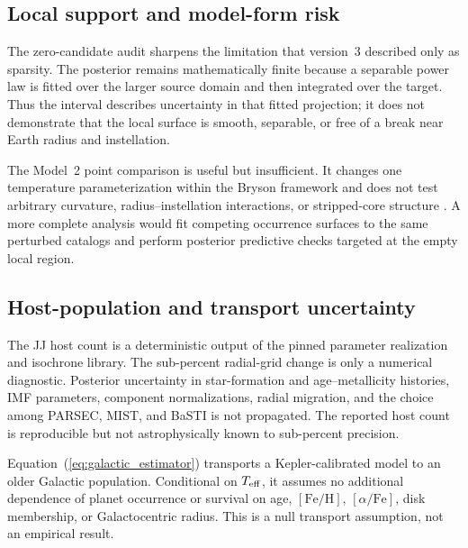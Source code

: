 \subsection{Local support and model-form risk}

The zero-candidate audit sharpens the limitation that version~3 described only
as sparsity. The posterior remains mathematically finite because a separable
power law is fitted over the larger source domain and then integrated over the
target. Thus the interval describes uncertainty in that fitted projection; it
does not demonstrate that the local surface is smooth, separable, or free of a
break near Earth radius and instellation.

The Model~2 point comparison is useful but insufficient. It changes one
temperature parameterization within the Bryson framework and does not test
arbitrary curvature, radius--instellation interactions, or stripped-core
structure \citep{LopezRice2018,Pascucci2019}. A more complete analysis would
fit competing occurrence surfaces to the same perturbed catalogs and perform
posterior predictive checks targeted at the empty local region.

\subsection{Host-population and transport uncertainty}\label{subsec:transport}

The JJ host count is a deterministic output of the pinned parameter realization
and isochrone library. The sub-percent radial-grid change is only a numerical
diagnostic. Posterior uncertainty in star-formation and age--metallicity
histories, IMF parameters, component normalizations, radial migration, and the
choice among PARSEC, MIST, and BaSTI is not propagated. The reported host count
is reproducible but not astrophysically known to sub-percent precision.

Equation~(\ref{eq:galactic_estimator}) transports a Kepler-calibrated model to
an older Galactic population. Conditional on $T_{\rm eff}$, it assumes no additional
dependence of planet occurrence or survival on age, $[\mathrm{Fe/H}]$,
$[\alpha/\mathrm{Fe}]$, disk membership, or Galactocentric radius. This is a
null transport assumption, not an empirical result.

